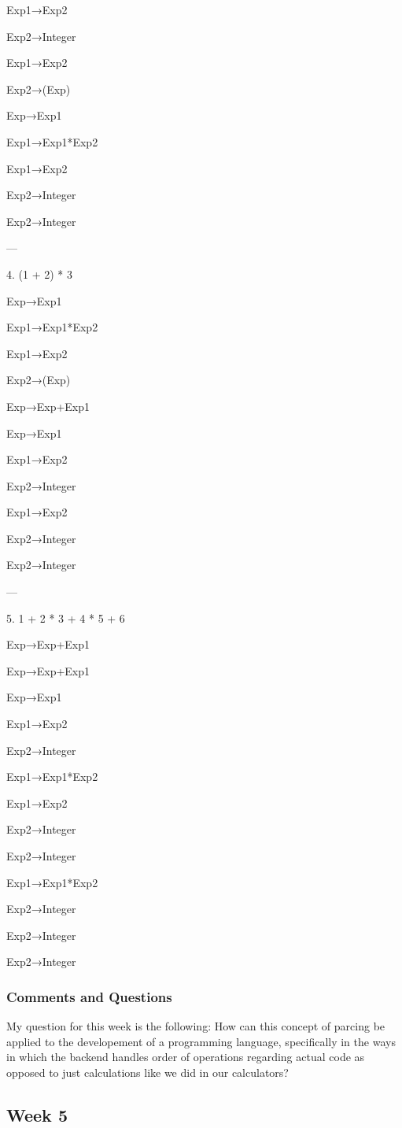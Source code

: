 \documentclass{article}
\theoremstyle{theorem}
\theoremstyle{definition}
\theoremstyle{remark}
\begin{document}
Exp1→Exp2

Exp2→Integer

Exp1→Exp2

Exp2→(Exp)

Exp→Exp1

Exp1→Exp1*Exp2

Exp1→Exp2

Exp2→Integer

Exp2→Integer

---

4. (1 + 2) * 3

Exp→Exp1

Exp1→Exp1*Exp2

Exp1→Exp2

Exp2→(Exp)

Exp→Exp+Exp1

Exp→Exp1

Exp1→Exp2

Exp2→Integer

Exp1→Exp2

Exp2→Integer

Exp2→Integer

---

5. 1 + 2 * 3 + 4 * 5 + 6

Exp→Exp+Exp1

Exp→Exp+Exp1

Exp→Exp1

Exp1→Exp2

Exp2→Integer

Exp1→Exp1*Exp2

Exp1→Exp2

Exp2→Integer

Exp2→Integer

Exp1→Exp1*Exp2

Exp2→Integer

Exp2→Integer

Exp2→Integer


\subsubsection*{Comments and Questions}

My question for this week is the following: How can this concept of parcing be applied to the developement of a programming language, specifically in the ways in which the backend handles order of operations regarding actual code as opposed to just calculations like we did in our calculators?

\subsection{Week 5}
\end{document}
